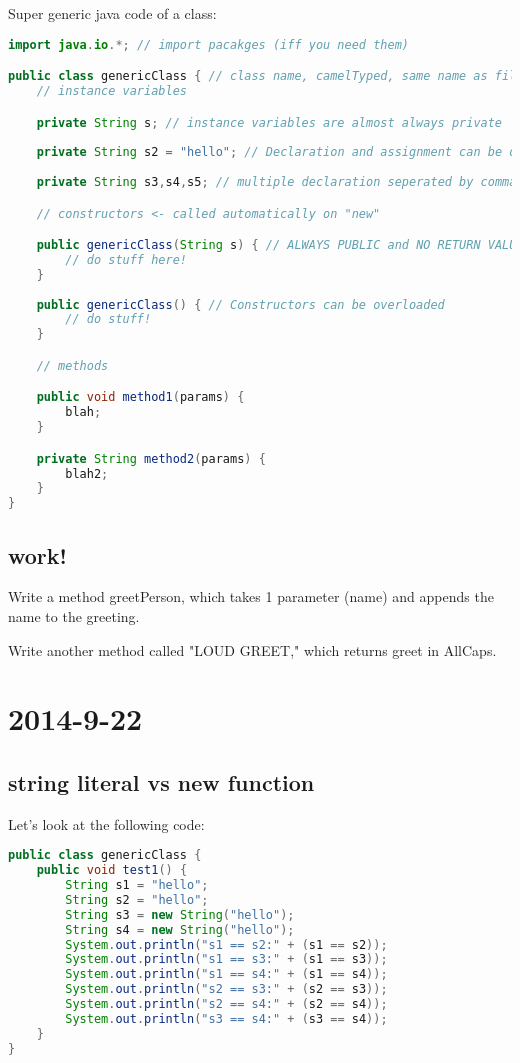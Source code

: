 \documentclass [12 pt, twoside] {article}
\begin{document}
Super generic java code of a class:
\begin{lstlisting}[language=java]
import java.io.*; // import pacakges (iff you need them)

public class genericClass { // class name, camelTyped, same name as file
	// instance variables

	private String s; // instance variables are almost always private
	
	private String s2 = "hello"; // Declaration and assignment can be done at once
	
	private String s3,s4,s5; // multiple declaration seperated by commas

	// constructors <- called automatically on "new"

	public genericClass(String s) { // ALWAYS PUBLIC and NO RETURN VALUE
		// do stuff here!
	}
	
	public genericClass() { // Constructors can be overloaded
		// do stuff!
	}

	// methods

	public void method1(params) {
		blah;
	}

	private String method2(params) {
		blah2;
	}
}
\end{lstlisting}


\subsection{work!}


Write a method greetPerson, which takes 1 parameter (name) and appends the name to the greeting.


Write another method called "LOUD GREET," which returns greet in AllCaps.


\section{2014-9-22}
\subsection{string literal vs new function}


Let's look at the following code:
\begin{lstlisting}[language=Java]
public class genericClass {
	public void test1() {
		String s1 = "hello";
		String s2 = "hello";
		String s3 = new String("hello");
		String s4 = new String("hello");
		System.out.println("s1 == s2:" + (s1 == s2));
		System.out.println("s1 == s3:" + (s1 == s3));
		System.out.println("s1 == s4:" + (s1 == s4));
		System.out.println("s2 == s3:" + (s2 == s3));
		System.out.println("s2 == s4:" + (s2 == s4));
		System.out.println("s3 == s4:" + (s3 == s4));
	}
}
\end{lstlisting}
\end{document}
